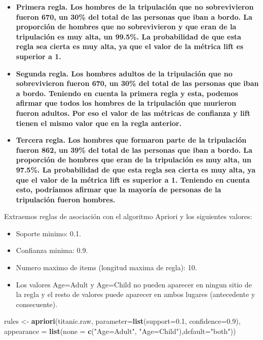 \documentclass[]{article}
\newenvironment{Shaded}{\begin{snugshade}}{\end{snugshade}}
\newcommand{\DataTypeTok}[1]{\textcolor[rgb]{0.13,0.29,0.53}{#1}}
\newcommand{\FloatTok}[1]{\textcolor[rgb]{0.00,0.00,0.81}{#1}}
\newcommand{\KeywordTok}[1]{\textcolor[rgb]{0.13,0.29,0.53}{\textbf{#1}}}
\newcommand{\NormalTok}[1]{#1}
\newcommand{\StringTok}[1]{\textcolor[rgb]{0.31,0.60,0.02}{#1}}
\providecommand{\tightlist}{%
  \setlength{\itemsep}{0pt}\setlength{\parskip}{0pt}}
\begin{document}
\begin{itemize}
\item
  \textbf{Primera regla. Los hombres de la tripulación que no
  sobrevivieron fueron 670, un 30\% del total de las personas que iban a
  bordo. La proporción de hombres que no sobrevivieron y que eran de la
  tripulación es muy alta, un 99.5\%. La probabilidad de que esta regla
  sea cierta es muy alta, ya que el valor de la métrica lift es superior
  a 1.}
\item
  \textbf{Segunda regla. Los hombres adultos de la tripulación que no
  sobrevivieron fueron 670, un 30\% del total de las personas que iban a
  bordo. Teniendo en cuenta la primera regla y esta, podemos afirmar que
  todos los hombres de la tripulación que murieron fueron adultos. Por
  eso el valor de las métricas de confianza y lift tienen el mismo valor
  que en la regla anterior.}
\item
  \textbf{Tercera regla. Los hombres que formaron parte de la
  tripulación fueron 862, un 39\% del total de las personas que iban a
  bordo. La proporción de hombres que eran de la tripulación es muy
  alta, un 97.5\%. La probabilidad de que esta regla sea cierta es muy
  alta, ya que el valor de la métrica lift es superior a 1. Teniendo en
  cuenta esto, podríamos afirmar que la mayoría de personas de la
  tripulación fueron hombres.}
\end{itemize}

Extraemos reglas de asociación con el algoritmo Apriori y los siguientes
valores:

\begin{itemize}
\tightlist
\item
  Soporte minimo: 0.1.
\item
  Confianza minima: 0.9.
\item
  Numero maximo de items (longitud maxima de regla): 10.
\item
  Los valores Age=Adult y Age=Child no pueden aparecer en ningun sitio
  de la regla y el resto de valores puede aparecer en ambos lugares
  (antecedente y consecuente).
\end{itemize}

\begin{Shaded}
\begin{Highlighting}[]
\NormalTok{rules <-}\StringTok{ }\KeywordTok{apriori}\NormalTok{(titanic.raw, }\DataTypeTok{parameter=}\KeywordTok{list}\NormalTok{(}\DataTypeTok{support=}\FloatTok{0.1}\NormalTok{, }\DataTypeTok{confidence=}\FloatTok{0.9}\NormalTok{), }
                 \DataTypeTok{appearance =} \KeywordTok{list}\NormalTok{(}\DataTypeTok{none =} \KeywordTok{c}\NormalTok{(}\StringTok{"Age=Adult"}\NormalTok{, }\StringTok{"Age=Child"}\NormalTok{),}\DataTypeTok{default=}\StringTok{"both"}\NormalTok{))}
\end{Highlighting}
\end{Shaded}
\end{document}

